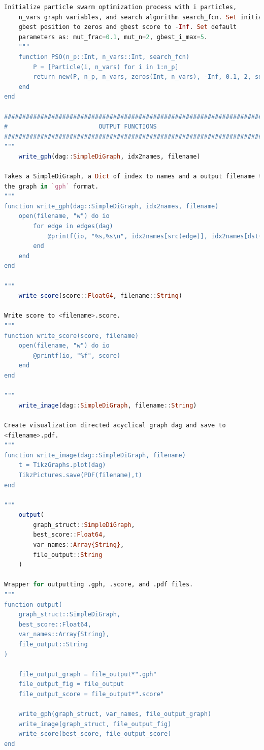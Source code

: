 \documentclass[twoside,11pt]{article}
\begin{document}
\begin{algorithm}
\begin{lstlisting}[language=Julia]
    Initialize particle swarm optimization process with i particles,
    n_vars graph variables, and search algorithm search_fcn. Set initial
    gbest position to zeros and gbest score to -Inf. Set default 
    parameters as: mut_frac=0.1, mut_n=2, gbest_i_max=5.
    """
    function PSO(n_p::Int, n_vars::Int, search_fcn)
        P = [Particle(i, n_vars) for i in 1:n_p]
        return new(P, n_p, n_vars, zeros(Int, n_vars), -Inf, 0.1, 2, search_fcn, 0, 5)
    end
end

########################################################################
#                         OUTPUT FUNCTIONS                             #
########################################################################
"""
    write_gph(dag::SimpleDiGraph, idx2names, filename)

Takes a SimpleDiGraph, a Dict of index to names and a output filename to write
the graph in `gph` format.
"""
function write_gph(dag::SimpleDiGraph, idx2names, filename)
    open(filename, "w") do io
        for edge in edges(dag)
            @printf(io, "%s,%s\n", idx2names[src(edge)], idx2names[dst(edge)])
        end
    end
end

"""
    write_score(score::Float64, filename::String)

Write score to <filename>.score.
"""
function write_score(score, filename)
    open(filename, "w") do io
        @printf(io, "%f", score)
    end
end

"""
    write_image(dag::SimpleDiGraph, filename::String)

Create visualization directed acyclical graph dag and save to 
<filename>.pdf.
"""
function write_image(dag::SimpleDiGraph, filename)
    t = TikzGraphs.plot(dag)
    TikzPictures.save(PDF(filename),t)
end

"""
    output(
        graph_struct::SimpleDiGraph,
        best_score::Float64,
        var_names::Array{String},
        file_output::String
    )

Wrapper for outputting .gph, .score, and .pdf files.
"""
function output(
    graph_struct::SimpleDiGraph,
    best_score::Float64,
    var_names::Array{String},
    file_output::String
)

    file_output_graph = file_output*".gph"
    file_output_fig = file_output
    file_output_score = file_output*".score"

    write_gph(graph_struct, var_names, file_output_graph)
    write_image(graph_struct, file_output_fig)
    write_score(best_score, file_output_score)
end


\end{lstlisting}
\end{algorithm}
\end{document}
